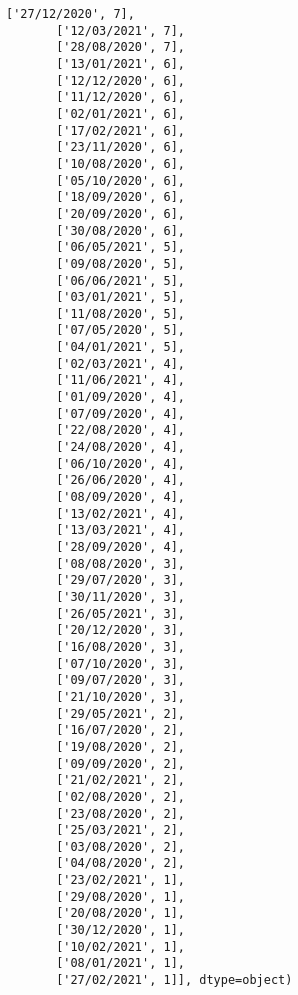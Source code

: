 \documentclass[11pt]{article}
\begin{document}
\begin{tcolorbox}[breakable, size=fbox, boxrule=.5pt, pad at break*=1mm, opacityfill=0]
\begin{Verbatim}[commandchars=\\\{\}]
       ['27/12/2020', 7],
       ['12/03/2021', 7],
       ['28/08/2020', 7],
       ['13/01/2021', 6],
       ['12/12/2020', 6],
       ['11/12/2020', 6],
       ['02/01/2021', 6],
       ['17/02/2021', 6],
       ['23/11/2020', 6],
       ['10/08/2020', 6],
       ['05/10/2020', 6],
       ['18/09/2020', 6],
       ['20/09/2020', 6],
       ['30/08/2020', 6],
       ['06/05/2021', 5],
       ['09/08/2020', 5],
       ['06/06/2021', 5],
       ['03/01/2021', 5],
       ['11/08/2020', 5],
       ['07/05/2020', 5],
       ['04/01/2021', 5],
       ['02/03/2021', 4],
       ['11/06/2021', 4],
       ['01/09/2020', 4],
       ['07/09/2020', 4],
       ['22/08/2020', 4],
       ['24/08/2020', 4],
       ['06/10/2020', 4],
       ['26/06/2020', 4],
       ['08/09/2020', 4],
       ['13/02/2021', 4],
       ['13/03/2021', 4],
       ['28/09/2020', 4],
       ['08/08/2020', 3],
       ['29/07/2020', 3],
       ['30/11/2020', 3],
       ['26/05/2021', 3],
       ['20/12/2020', 3],
       ['16/08/2020', 3],
       ['07/10/2020', 3],
       ['09/07/2020', 3],
       ['21/10/2020', 3],
       ['29/05/2021', 2],
       ['16/07/2020', 2],
       ['19/08/2020', 2],
       ['09/09/2020', 2],
       ['21/02/2021', 2],
       ['02/08/2020', 2],
       ['23/08/2020', 2],
       ['25/03/2021', 2],
       ['03/08/2020', 2],
       ['04/08/2020', 2],
       ['23/02/2021', 1],
       ['29/08/2020', 1],
       ['20/08/2020', 1],
       ['30/12/2020', 1],
       ['10/02/2021', 1],
       ['08/01/2021', 1],
       ['27/02/2021', 1]], dtype=object)
\end{Verbatim}
\end{tcolorbox}
        
\end{document}
